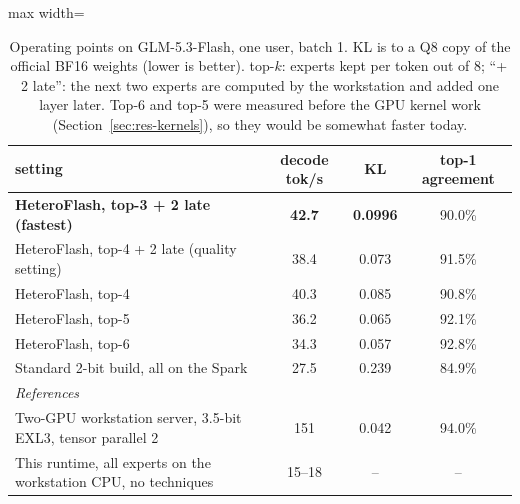 \documentclass[11pt]{article}
\begin{document}
\begin{table}[h]
\centering\small
\caption{Operating points on GLM-5.3-Flash, one user, batch 1. KL is to a Q8 copy of the official BF16 weights (lower is
better). top-$k$: experts kept per token out of 8; ``+\,2 late'': the next two experts are computed by the workstation and
added one layer later. Top-6 and top-5 were measured before the GPU kernel work (Section~\ref{sec:res-kernels}), so they
would be somewhat faster today.}
\label{tab:headline}
\begin{adjustbox}{max width=\linewidth}
\begin{tabular}{lccc}
\toprule
setting & decode tok/s & KL & top-1 agreement \\
\midrule
\textbf{HeteroFlash, top-3 + 2 late (fastest)} & \textbf{42.7} & \textbf{0.0996} & 90.0\% \\
HeteroFlash, top-4 + 2 late (quality setting) & 38.4 & 0.073 & 91.5\% \\
HeteroFlash, top-4 & 40.3 & 0.085 & 90.8\% \\
HeteroFlash, top-5 & 36.2 & 0.065 & 92.1\% \\
HeteroFlash, top-6 & 34.3 & 0.057 & 92.8\% \\
Standard 2-bit build, all on the Spark & 27.5 & 0.239 & 84.9\% \\
\midrule
\multicolumn{4}{l}{\emph{References}} \\
Two-GPU workstation server, 3.5-bit EXL3, tensor parallel 2 & 151 & 0.042 & 94.0\% \\
This runtime, all experts on the workstation CPU, no techniques & 15--18 & -- & -- \\
\bottomrule
\end{tabular}
\end{adjustbox}
\end{table}
\end{document}
